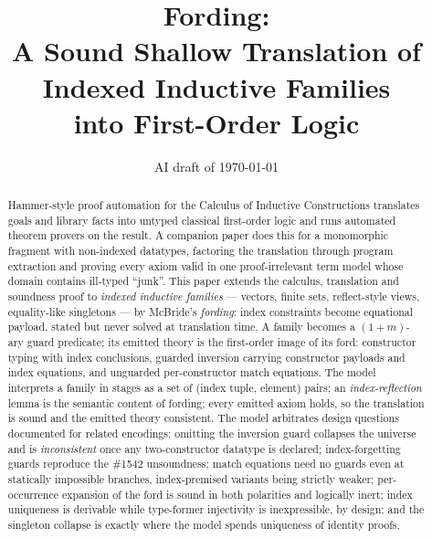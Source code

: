 \documentclass[11pt,a4paper]{article}
\title{Fording:\\
  A Sound Shallow Translation of Indexed Inductive Families\\
  into First-Order Logic}
\author{}
\date{AI draft of \today}
\begin{document}
\maketitle

\begin{abstract}
  Hammer-style proof automation for the Calculus of Inductive
  Constructions translates goals and library facts into untyped
  classical first-order logic and runs automated theorem provers on
  the result.  A companion paper does this for a monomorphic fragment
  with non-indexed datatypes, factoring the translation through
  program extraction and proving every axiom valid in one
  proof-irrelevant term model whose domain contains ill-typed
  ``junk''.  This paper extends the calculus, translation and
  soundness proof to \emph{indexed inductive families} --- vectors,
  finite sets, \textsf{reflect}-style views, equality-like singletons
  --- by McBride's \emph{fording}: index constraints become equational
  payload, stated but never solved at translation time.  A family
  becomes a $(1{+}m)$-ary guard predicate; its emitted theory is the
  first-order image of its ford: constructor typing with index
  conclusions, guarded inversion carrying constructor payloads and
  index equations, and unguarded per-constructor match equations.  The
  model interprets a family in stages as a set of (index tuple,
  element) pairs; an \emph{index-reflection} lemma is the semantic
  content of fording; every emitted axiom holds, so the translation is
  sound and the emitted theory consistent.  The model arbitrates
  design questions documented for related encodings: omitting the
  inversion guard collapses the universe and is \emph{inconsistent}
  once any two-constructor datatype is declared; index-forgetting
  guards reproduce the \fstar{} \#1542 unsoundness; match equations
  need no guards even at statically impossible branches,
  index-premised variants being strictly weaker; per-occurrence
  expansion of the ford is sound in both polarities and logically
  inert; index uniqueness is derivable while type-former injectivity
  is inexpressible, by design; and the singleton collapse is exactly
  where the model spends uniqueness of identity proofs.
\end{abstract}

\tableofcontents
















\appendix

\end{document}
